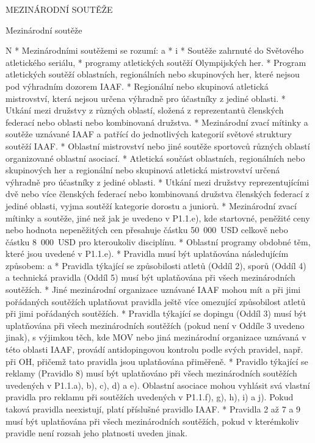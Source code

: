 \chap MEZINÁRODNÍ SOUTĚŽE

\secc Mezinárodní soutěže

\begitems \style N
* Mezinárodními soutěžemi se rozumí:
  \begitems \style a
  *
    \begitems \style i
    * Soutěže zahrnuté do Světového atletického seriálu,
    * programy atletických soutěží Olympijských her.
    \enditems
  * Program atletických soutěží oblastních, regionálních nebo skupinových her, které nejsou pod výhradním dozorem IAAF.
  * Regionální nebo skupinová atletická mistrovství, která nejsou určena výhradně pro účastníky z jediné oblasti.
  * Utkání mezi družstvy z různých oblastí, složená z reprezentantů členských federací nebo oblasti nebo kombinovaná družstva.
  * Mezinárodní zvací mítinky a soutěže uznávané IAAF a patřící do jednotlivých kategorií světové struktury soutěží IAAF.
  * Oblastní mistrovství nebo jiné soutěže sportovců různých oblastí organizované oblastní asociací.
  * Atletická součást oblastních, regionálních nebo skupinových her a regionální nebo skupinová atletická mistrovství určená výhradně pro účastníky z jediné oblasti.
  * Utkání mezi družstvy reprezentujícími dvě nebo více členských federací nebo kombinovaná družstva členských federací z jediné oblasti, vyjma soutěží kategorie dorostu a juniorů.
  * Mezinárodní zvací mítinky a soutěže, jiné než jak je uvedeno v P1.1.e), kde startovné, peněžité ceny nebo hodnota nepeněžitých cen přesahuje částku 50~000~USD celkově nebo částku 8~000~USD pro kteroukoliv disciplínu.
  * Oblastní programy obdobné těm, které jsou uvedené v P1.1.e).
  \enditems
* Pravidla musí být uplatňována následujícím způsobem:
  \begitems \style a
  * Pravidla týkající se způsobilosti atletů (Oddíl 2), sporů (Oddíl 4) a technická pravidla (Oddíl 5) musí být uplatňována při všech mezinárodních soutěžích.
  * Jiné mezinárodní organizace uznávané IAAF mohou mít a při jimi pořádaných soutěžích uplatňovat pravidla ještě více omezující způsobilost atletů při jimi pořádaných soutěžích.
  * Pravidla týkající se dopingu (Oddíl 3) musí být uplatňována při všech mezinárodních soutěžích (pokud není v Oddíle 3 uvedeno jinak), s výjimkou těch, kde MOV nebo jiná mezinárodní organizace uznávaná v této oblasti IAAF, provádí antidopingovou kontrolu podle svých pravidel, např. při OH, přičemž tato pravidla jsou uplatňována přiměřeně.
  * Pravidlo týkající se reklamy (Pravidlo 8) musí být uplatňováno při všech mezinárodních soutěžích uvedených v P1.1.a), b), c), d) a e). Oblastní asociace mohou vyhlásit svá vlastní pravidla pro reklamu při soutěžích uvedených v P1.1.f), g), h), i) a j). Pokud taková pravidla neexistují, platí příslušné pravidlo IAAF.
  * Pravidla 2 až 7 a 9 musí být uplatňována při všech mezinárodních soutěžích, pokud v kterémkoliv pravidle není rozsah jeho platnosti uveden jinak.
  \enditems
\enditems

